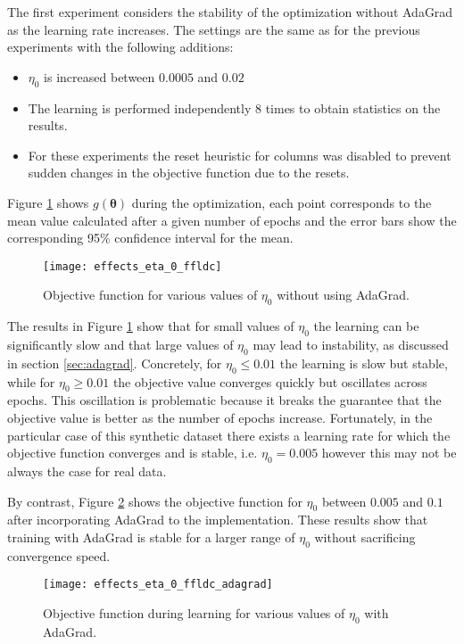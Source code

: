 The first experiment considers the stability of the optimization without AdaGrad as the learning rate increases. The settings are the same as for the previous experiments with the following additions:

\begin{itemize}
  \item $\eta_{0}$ is increased between $0.0005$ and $0.02$
  \item The learning is performed independently 8 times to obtain statistics on the results.
  \item For these experiments the reset heuristic for columns was disabled to prevent sudden changes in the objective function due to the resets.
\end{itemize}

Figure \ref{fig:effects_eta_0} shows $g(\boldsymbol{\theta})$ during the optimization, each point corresponds to the mean value calculated after a given number of epochs and the error bars show the corresponding 95\% confidence interval for the mean.

\begin{figure}
  \centering
  \texttt{[image: effects\_eta\_0\_ffldc]}
  \caption{Objective function for various values of $\eta_0$ without using AdaGrad.}
  \label{fig:effects_eta_0}
\end{figure}

The results in Figure \ref{fig:effects_eta_0} show that for small values of $\eta_0$ the learning can be significantly slow and that large values of $\eta_0$ may lead to instability, as discussed in section \ref{sec:adagrad}. Concretely, for $\eta_{0} \leq 0.01$ the learning is slow but stable, while for $\eta_{0} \geq 0.01$ the objective value converges quickly but oscillates across epochs. This oscillation is problematic because it breaks the guarantee that the objective value is better as the number of epochs increase. Fortunately, in the particular case of this synthetic dataset there exists a learning rate for which the objective function converges and is stable, i.e. $\eta_{0} = 0.005$ however this may not be always the case for real data.

By contrast, Figure \ref{fig:effects_adagrad} shows the objective function for $\eta_{0}$ between $0.005$ and $0.1$ after incorporating AdaGrad to the implementation. These results show that training with AdaGrad is stable for a larger range of $\eta_0$ without sacrificing convergence speed.

\begin{figure}
  \centering
  \texttt{[image: effects\_eta\_0\_ffldc\_adagrad]}
  \caption{Objective function during learning for various values of $\eta_0$ with AdaGrad.}
  \label{fig:effects_adagrad}
\end{figure}

